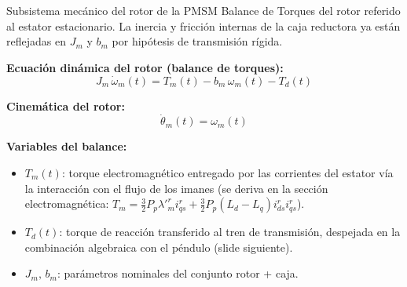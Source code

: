 \documentclass[aspectratio=169,t]{beamer}
\begin{document}
\begin{frame}{Subsistema mecánico del rotor de la PMSM}
{\small\color{uncGray}Balance de Torques del rotor referido al estator estacionario. La inercia y fricción internas de la caja reductora ya están reflejadas en $J_m$ y $b_m$ por hipótesis de transmisión rígida.}\par
\vspace{4mm}

\textbf{Ecuación dinámica del rotor (balance de torques):}
\begin{equation*}
J_m\,\dot{\omega}_m(t) = T_m(t) - b_m\,\omega_m(t) - T_d(t)
\end{equation*}

\textbf{Cinemática del rotor:}
\begin{equation*}
\dot{\theta}_m(t) = \omega_m(t)
\end{equation*}

\textbf{Variables del balance:}
\begin{itemize}
\item $T_m(t)$: torque electromagnético entregado por las corrientes del estator vía la interacción con el flujo de los imanes (se deriva en la sección electromagnética: $T_m = \tfrac{3}{2}P_p\lambda'^r_m i_{qs}^r + \tfrac{3}{2}P_p(L_d-L_q)i_{ds}^r i_{qs}^r$).
\item $T_d(t)$: torque de reacción transferido al tren de transmisión, despejada en la combinación algebraica con el péndulo (slide siguiente).
\item $J_m,\,b_m$: parámetros nominales del conjunto rotor + caja.
\end{itemize}
\end{frame}
\end{document}
